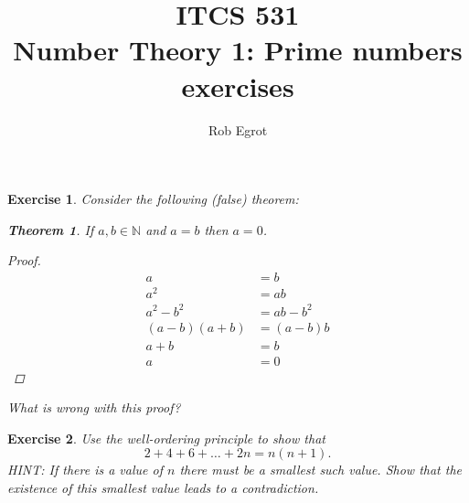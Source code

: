 \documentclass{article}
\title{ITCS 531 \\Number Theory 1: Prime numbers exercises}
\author{Rob Egrot}
\date{}
\theoremstyle{plain}
\newtheorem{Q}{Exercise}{\bfseries}{\upshape}
\newtheorem*{theorem*}{Theorem}
\newcommand{\bN}{\mathbb{N}}
\begin{document}
\maketitle

\begin{Q}
Consider the following (false) theorem: 
\begin{theorem*}If $a,b\in \bN$ and $a=b$ then $a=0$.
\end{theorem*}
\begin{proof}
\begin{align*}
a&=b\\
a^2&= ab\\
a^2-b^2&=ab-b^2\\
(a-b)(a+b)&=(a-b)b\\
a+b&= b\\
a&=0
\end{align*}
\end{proof}
What is wrong with this proof?
\end{Q}
\begin{comment}
\textbf{Solution:} Since $a = b$ we know that $a - b = 0$. We are not allowed to divide by zero, as the result of this is not usually defined. In general, we cannot divide by zero, or even by something that could be zero, and expect the argument to be valid. This means that when we divide by $(a-b)$ in this argument, we are doing something wrong, and we can't trust the proof after that point.
\end{comment}

\begin{Q}
Use the well-ordering principle to show that \[2+4+6+\ldots + 2n = n(n+1).\] HINT: If there is a value of $n$ there must be a smallest such value. Show that the existence of this smallest value leads to a contradiction.
\end{Q}
\begin{comment}
\textbf{Solution:} Suppose there is some positive integer such that the identity given in the question is not valid. Then, by the well-ordering principle, there must be a smallest such number. Call this number $k$. Now, $k$ cannot be $1$, as we can easily check the identity is true for $n=1$. Since $k$ is the smallest number for which the identity above does not hold, it must be true for $k-1$. So we have 
\[2+\ldots + 2(k-1) = (k-1)(k),\] 
and so, adding $2k$ to both sides we have
\[2+\ldots + 2(k-1) +2k = (k-1)(k)+2k.\]
But 
\[(k-1)(k)+2k = (k)(k+1),\]
and so
\[2+\ldots +2k = (k)(k+1).\]
This is a contradiction because $k$ is supposed to invalidate the identity. We conclude that there can be no positive integer for which the identity is false.
\end{comment}
\end{document}
